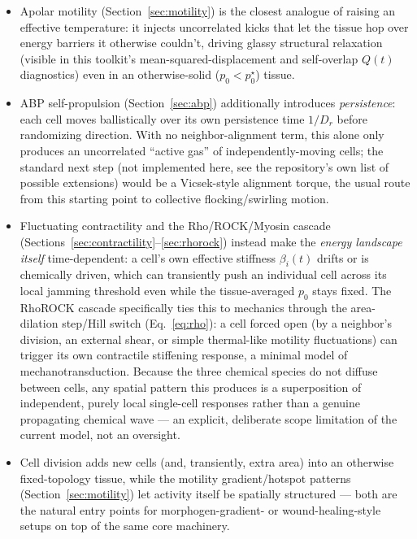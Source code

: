 \documentclass[11pt]{article}
\begin{document}
\begin{itemize}
  \item Apolar motility (Section~\ref{sec:motility}) is the closest analogue of raising
  an effective temperature: it injects uncorrelated kicks that let the tissue hop over
  energy barriers it otherwise couldn't, driving glassy structural relaxation (visible
  in this toolkit's mean-squared-displacement and self-overlap $Q(t)$ diagnostics) even
  in an otherwise-solid ($p_0<p_0^\star$) tissue.
  \item ABP self-propulsion (Section~\ref{sec:abp}) additionally introduces
  \emph{persistence}: each cell moves ballistically over its own persistence time
  $1/D_r$ before randomizing direction. With no neighbor-alignment term, this alone only
  produces an uncorrelated ``active gas'' of independently-moving cells; the standard
  next step (not implemented here, see the repository's own list of possible
  extensions) would be a Vicsek-style alignment torque, the usual route from this
  starting point to collective flocking/swirling motion.
  \item Fluctuating contractility and the Rho/ROCK/Myosin cascade
  (Sections~\ref{sec:contractility}--\ref{sec:rhorock}) instead make the \emph{energy
  landscape itself} time-dependent: a cell's own effective stiffness $\beta_i(t)$
  drifts or is chemically driven, which can transiently push an individual cell across
  its local jamming threshold even while the tissue-averaged $p_0$ stays fixed. The
  RhoROCK cascade specifically ties this to mechanics through the area-dilation
  step/Hill switch (Eq.~\eqref{eq:rho}): a cell forced open (by a neighbor's division, an
  external shear, or simple thermal-like motility fluctuations) can trigger its own
  contractile stiffening response, a minimal model of mechanotransduction. Because the
  three chemical species do not diffuse between cells, any spatial pattern this produces
  is a superposition of independent, purely local single-cell responses rather than a
  genuine propagating chemical wave --- an explicit, deliberate scope limitation of the
  current model, not an oversight.
  \item Cell division adds new cells (and, transiently, extra area) into an otherwise
  fixed-topology tissue, while the motility gradient/hotspot patterns
  (Section~\ref{sec:motility}) let activity itself be spatially structured --- both are
  the natural entry points for morphogen-gradient- or wound-healing-style setups on top
  of the same core machinery.
\end{itemize}
\end{document}
